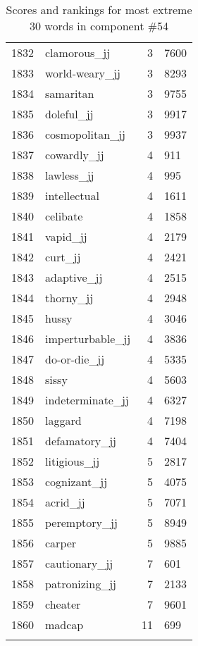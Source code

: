 \begin{longtable}[!htbp]{| rlr@{.}l |}
    1832 & clamorous\_jj & 3 & 7600 \\
    1833 & world-weary\_jj & 3 & 8293 \\
    1834 & samaritan & 3 & 9755 \\
    1835 & doleful\_jj & 3 & 9917 \\
    1836 & cosmopolitan\_jj & 3 & 9937 \\
    1837 & cowardly\_jj & 4 & 911 \\
    1838 & lawless\_jj & 4 & 995 \\
    1839 & intellectual & 4 & 1611 \\
    1840 & celibate & 4 & 1858 \\
    1841 & vapid\_jj & 4 & 2179 \\
    1842 & curt\_jj & 4 & 2421 \\
    1843 & adaptive\_jj & 4 & 2515 \\
    1844 & thorny\_jj & 4 & 2948 \\
    1845 & hussy & 4 & 3046 \\
    1846 & imperturbable\_jj & 4 & 3836 \\
    1847 & do-or-die\_jj & 4 & 5335 \\
    1848 & sissy & 4 & 5603 \\
    1849 & indeterminate\_jj & 4 & 6327 \\
    1850 & laggard & 4 & 7198 \\
    1851 & defamatory\_jj & 4 & 7404 \\
    1852 & litigious\_jj & 5 & 2817 \\
    1853 & cognizant\_jj & 5 & 4075 \\
    1854 & acrid\_jj & 5 & 7071 \\
    1855 & peremptory\_jj & 5 & 8949 \\
    1856 & carper & 5 & 9885 \\
    1857 & cautionary\_jj & 7 & 601 \\
    1858 & patronizing\_jj & 7 & 2133 \\
    1859 & cheater & 7 & 9601 \\
    1860 & madcap & 11 & 699 \\
    \hline
    \caption{Scores and rankings for most extreme 30 words in component \#54} \\
\end{longtable}
